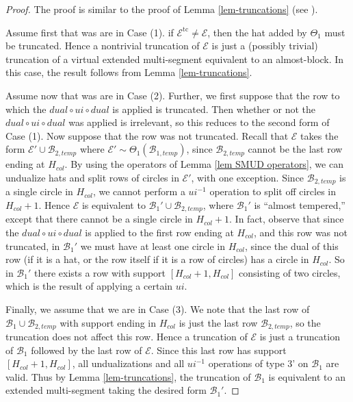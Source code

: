\documentclass[11pt,letterpaper]{amsart}
\newcommand{\inv}{^{-1}}
\newcommand{\BB}{\mathcal{B}}
\newcommand{\EE}{\mathcal{E}}
\newcommand{\tc}{\operatorname{tc}}
\numberwithin{equation}{section}
\begin{document}
\begin{proof}
    The proof is similar to the proof of Lemma \ref{lem-truncations} (see \cite[Lemma 7.10]{HKT26}). 
    
    Assume first that was are in Case (1). if $\EE^{\tc} \neq \EE$, then the hat added by $\Theta_1$ must be truncated. Hence a nontrivial truncation of $\EE$ is just a (possibly trivial) truncation of a virtual extended multi-segment equivalent to an almost-block. In this case, the result follows from Lemma \ref{lem-truncations}.

    Assume now that was are in Case (2). Further, we first suppose that the row to which the $dual \circ ui \circ dual$ is applied is truncated. Then whether or not the $dual \circ ui \circ dual$ was applied is irrelevant, so this reduces to the second form of Case (1). Now suppose that the row was not truncated. Recall that $\EE$ takes the form $\EE' \cup \BB_{2, temp}$ where $\EE' \sim \Theta_1(\BB_{1, temp})$, since $\BB_{2, temp}$ cannot be the last row ending at $H_{col}$. By using the operators of Lemma \ref{lem SMUD operators}, we can undualize hats and split rows of circles in $\EE'$, with one exception. Since $\BB_{2, temp}$ is a single circle in $H_{col}$, we cannot perform a $ui\inv$ operation to split off circles in $H_{col}+1$. Hence $\EE$ is equivalent to $\BB_1' \cup \BB_{2, temp}$, where $\BB_1'$ is ``almost tempered,'' except that there cannot be a single circle in $H_{col}+1$. In fact, observe that since the $dual \circ ui \circ dual$ is applied to the first row ending at $H_{col}$, and this row was not truncated, in $\BB_1'$ we must have at least one circle in $H_{col}$, since the dual of this row (if it is a hat, or the row itself if it is a row of circles) has a circle in $H_{col}$. So in $\BB_1'$ there exists a row with support $[H_{col}+1, H_{col}]$ consisting of two circles, which is the result of applying a certain $ui$.

    Finally, we assume that we are in Case (3). We note that the last row of $\BB_1 \cup \BB_{2, temp}$ with support ending in $H_{col}$ is just the last row $\BB_{2, temp}$, so the truncation does not affect this row. Hence a truncation of $\EE$ is just a truncation of $\BB_1$ followed by the last row of $\EE$. Since this last row has support $[H_{col}+1, H_{col}]$, all undualizations and all $ui\inv$ operations of type 3' on $\BB_1$ are valid. Thus by Lemma \ref{lem-truncations}, the truncation of $\BB_1$ is equivalent to an extended multi-segment taking the desired form $\BB_1'$.
\end{proof}
\end{document}
